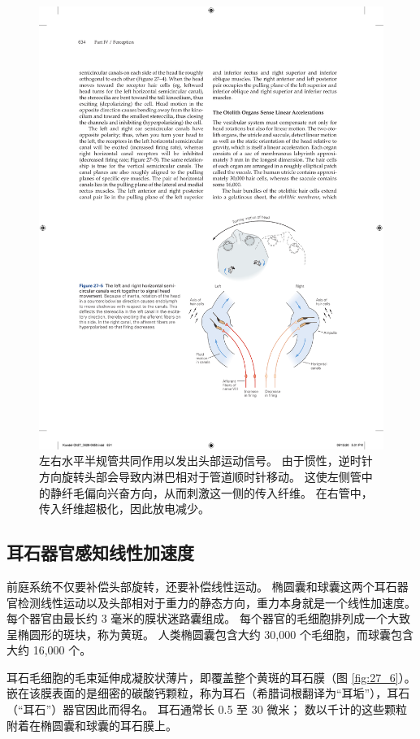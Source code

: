 \begin{figure}[htbp]
	\centering
	\includegraphics[width=0.6\linewidth]{chap27/fig_27_5}
	\caption{左右水平半规管共同作用以发出头部运动信号。 由于惯性，逆时针方向旋转头部会导致内淋巴相对于管道顺时针移动。 这使左侧管中的静纤毛偏向兴奋方向，从而刺激这一侧的传入纤维。 在右管中，传入纤维超极化，因此放电减少。}
	\label{fig:27_5}
\end{figure}



\subsection{耳石器官感知线性加速度}
前庭系统不仅要补偿头部旋转，还要补偿线性运动。 椭圆囊和球囊这两个耳石器官检测线性运动以及头部相对于重力的静态方向，重力本身就是一个线性加速度。 每个器官由最长约 3 毫米的膜状迷路囊组成。 每个器官的毛细胞排列成一个大致呈椭圆形的斑块，称为黄斑。 人类椭圆囊包含大约 30,000 个毛细胞，而球囊包含大约 16,000 个。

耳石毛细胞的毛束延伸成凝胶状薄片，即覆盖整个黄斑的耳石膜（图 \ref{fig:27_6}）。 
嵌在该膜表面的是细密的碳酸钙颗粒，称为耳石（希腊词根翻译为“耳垢”），耳石（“耳石”）器官因此而得名。 耳石通常长 0.5 至 30 微米； 数以千计的这些颗粒附着在椭圆囊和球囊的耳石膜上。

